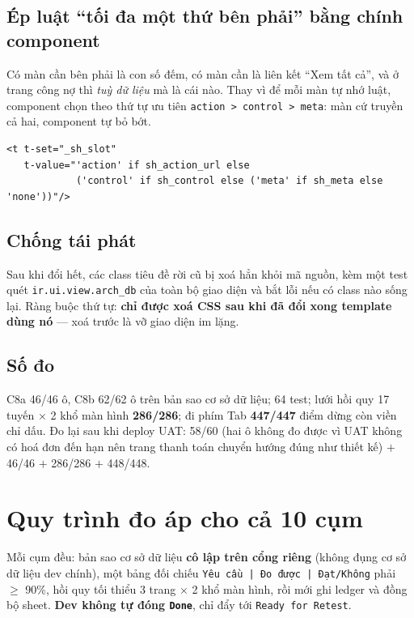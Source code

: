 \subsection{Ép luật ``tối đa một thứ bên phải'' bằng chính component}

Có màn cần bên phải là con số đếm, có màn cần là liên kết ``Xem tất cả'', và ở trang công nợ
thì \emph{tuỳ dữ liệu} mà là cái nào. Thay vì để mỗi màn tự nhớ luật, component chọn theo thứ
tự ưu tiên \texttt{action > control > meta}: màn cứ truyền cả hai, component tự bỏ bớt.

\begin{verbatim}
<t t-set="_sh_slot"
   t-value="'action' if sh_action_url else
            ('control' if sh_control else ('meta' if sh_meta else 'none'))"/>
\end{verbatim}

\subsection{Chống tái phát}

Sau khi đổi hết, các class tiêu đề rời cũ bị xoá hẳn khỏi mã nguồn, kèm một test quét
\texttt{ir.ui.view.arch\_db} của toàn bộ giao diện và bắt lỗi nếu có class nào sống lại. Ràng
buộc thứ tự: \textbf{chỉ được xoá CSS sau khi đã đổi xong template dùng nó} --- xoá trước là
vỡ giao diện im lặng.

\subsection{Số đo}

C8a 46/46 ô, C8b 62/62 ô trên bản sao cơ sở dữ liệu; 64 test; lưới hồi quy 17 tuyến $\times$ 2
khổ màn hình \textbf{286/286}; đi phím Tab \textbf{447/447} điểm dừng còn viền chỉ dấu. Đo lại
sau khi deploy UAT: 58/60 (hai ô không đo được vì UAT không có hoá đơn đến hạn nên trang thanh
toán chuyển hướng đúng như thiết kế) $+$ 46/46 $+$ 286/286 $+$ 448/448.

\section{Quy trình đo áp cho cả 10 cụm}

Mỗi cụm đều: bản sao cơ sở dữ liệu \textbf{cô lập trên cổng riêng} (không đụng cơ sở dữ liệu
dev chính), một bảng đối chiếu \texttt{Yêu cầu | Đo được | Đạt/Không} phải $\geq$ 90\%, hồi quy
tối thiểu 3 trang $\times$ 2 khổ màn hình, rồi mới ghi ledger và đồng bộ sheet. \textbf{Dev
không tự đóng \texttt{Done}}, chỉ đẩy tới \texttt{Ready for Retest}.

